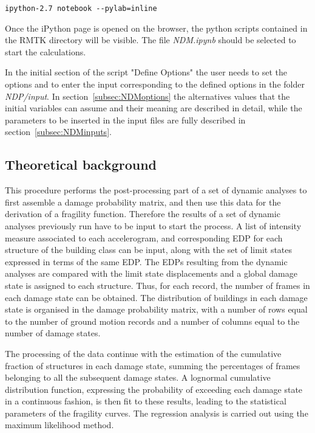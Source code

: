 \begin{Verbatim}[frame=single, commandchars=\\\{\}, samepage=true]
ipython-2.7 notebook --pylab=inline
\end{Verbatim}

Once the iPython page is opened on the browser, the python scripts contained in the RMTK directory will be visible. The file \textit{NDM.ipynb} should be selected to start the calculations.

In the initial section of the script "Define Options" the user needs to set the options and to enter the input corresponding to the defined options in the folder \textit{NDP/input}. In section~\ref{subsec:NDMoptions} the alternatives values that the initial variables can assume and their meaning are described in detail, while the parameters to be inserted in the input files are fully described in section~\ref{subsec:NDMinputs}.

\subsection{Theoretical background}
\label{subsec:NDMtheory}
This procedure performs the post-processing part of a set of dynamic analyses to first assemble a damage probability matrix, and then use this data for the derivation of a fragility function. Therefore the results of a set of dynamic analyses previously run have to be input to start the process. A list of intensity measure associated to each accelerogram, and corresponding EDP for each structure of the building class can be input, along with the set of limit states expressed in terms of the same EDP. The EDPs resulting from the dynamic analyses are compared with the limit state displacements and a global damage state is assigned to each structure. Thus, for each record, the number of frames in each damage state can be obtained. The distribution of buildings in each damage state is organised in the damage probability matrix, with a number of rows equal to the number of ground motion records and a number of columns equal to the number of damage states.

The processing of the data continue with the estimation of the cumulative fraction of structures in each damage state, summing the percentages of frames belonging to all the subsequent damage states. A lognormal cumulative distribution function, expressing the probability of exceeding each damage state in a continuous fashion, is then fit to these results, leading to the statistical parameters of the fragility curves. The regression analysis is carried out using the maximum likelihood method.

